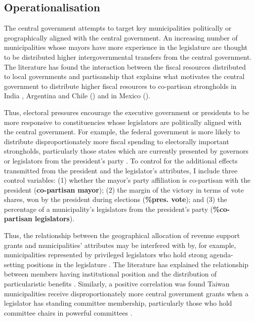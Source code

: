 \subsection*{Operationalisation}

The central government attempts to target key municipalities politically or geographically aligned with the central government. An increasing number of municipalities whose mayors have more experience in the legislature are thought to be distributed higher intergovernmental transfers from the central government. The literature has found the interaction between the fiscal resources distributed to local governments and partisanship that explains what motivates the central government to distribute higher fiscal resources to co-partisan strongholds in India \citep{Keefer2008,Keefer2009}, Argentina and Chile (\citealt{Calvo2004,Luna2010}) and in Mexico (\citealt{Diaz-Cayeros2003,Costa-i-Font2003}).

Thus, electoral pressures encourage the executive government or presidents to be more responsive to constituencies whose legislators are politically aligned with the central government. For example, the federal government is more likely to distribute disproportionately more fiscal spending to electorally important strongholds, particularly those states which are currently presented by governors or legislators from the president's party \citep{Aidt2012, Albouy2013, Kriner2015}. To control for the additional effects transmitted from the president and the legislator's attributes, I include three control variables: (1) whether the mayor's party affiliation is co-partisan with the president (\textbf{co-partisan mayor}); (2) the margin of the victory in terms of vote shares, won by the president during elections (\textbf{\%pres. vote}); and (3) the percentage of a municipality's legislators from the president's party (\textbf{\%co-partisan legislators}).

Thus, the relationship between the geographical allocation of revenue support grants and municipalities' attributes may be interfered with by, for example, municipalities represented by privileged legislators who hold strong agenda-setting positions in the legislature \citep[e.g.,][]{Engstrom2010, Martin2014}. The literature has explained the relationship between members having institutional position and the distribution of particularistic benefits \citep{Lazarus2009,Lee2003,Clemens2015,Balla2002,Lai2013,Luor2004,Luor2000, Berry2010}. Similarly, a positive correlation was found Taiwan municipalities receive disproportionately more central government grants when a legislator has standing committee membership, particularly those who hold committee chairs in powerful committees \citep{Chiu2013,Hsiao2007,Matsuo2012,Lai2013}.

